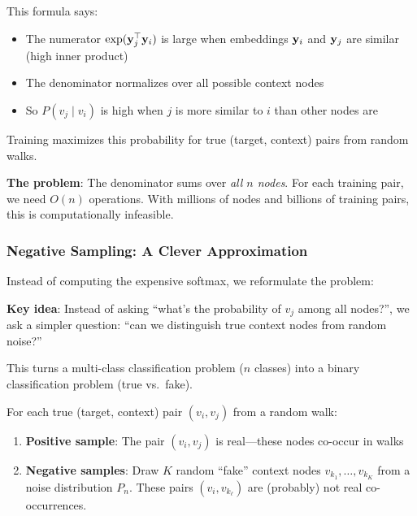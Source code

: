 \begin{notechapter}
\begin{intuition}
This formula says:
\begin{itemize}
    \item The numerator $\exp(\mathbf{y}_j^\top \mathbf{y}_i)$ is large when embeddings $\mathbf{y}_i$ and $\mathbf{y}_j$ are similar (high inner product)
    \item The denominator normalizes over all possible context nodes
    \item So $P(v_j \mid v_i)$ is high when $j$ is more similar to $i$ than other nodes are
\end{itemize}
Training maximizes this probability for true (target, context) pairs from random walks.
\end{intuition}

\textbf{The problem}: The denominator sums over \emph{all $n$ nodes}. For each training pair, we need $O(n)$ operations. With millions of nodes and billions of training pairs, this is computationally infeasible.

\subsubsection*{Negative Sampling: A Clever Approximation}

Instead of computing the expensive softmax, we reformulate the problem:

\begin{keyinsight}
\textbf{Key idea}: Instead of asking ``what's the probability of $v_j$ among all nodes?'', we ask a simpler question: ``can we distinguish true context nodes from random noise?''

This turns a multi-class classification problem ($n$ classes) into a binary classification problem (true vs.\ fake).
\end{keyinsight}

\begin{definition}
For each true (target, context) pair $(v_i, v_j)$ from a random walk:
\begin{enumerate}
    \item \textbf{Positive sample}: The pair $(v_i, v_j)$ is real---these nodes co-occur in walks
    \item \textbf{Negative samples}: Draw $K$ random ``fake'' context nodes $v_{k_1}, \ldots, v_{k_K}$ from a noise distribution $P_n$. These pairs $(v_i, v_{k_\ell})$ are (probably) not real co-occurrences.
\end{enumerate}


\end{definition}
\end{notechapter}
